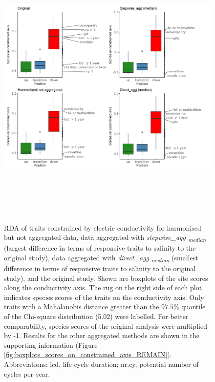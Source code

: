 \documentclass[12pt]{article}
\begin{document}
\begin{figure}[H]
  \centering
  \includegraphics[width=17cm, height=14.5cm]{boxplot_scores_combined.png}
  \caption{RDA of traits constrained by electric conductivity for harmonised but not aggregated data, data aggregated with \textit{stepwise\_agg \textsubscript{median}} (largest difference in terms of responsive traits to salinity to the original study), data aggregated with \textit{direct\_agg \textsubscript{median}} (smallest difference in terms of responsive traits to salinity to the original study), and the original study. Shown are boxplots of the site scores along the conductivity axis. The rug on the right side of each plot indicates species scores of the traits on the conductivity axis. Only traits with a Mahalanobis distance greater than the $97.5 \%$ quantile of the Chi-square distribution (5.02) were labelled. For better comparability, species scores of the original analysis were multiplied by -1. Results for the other aggregated methods are shown in the supporting information (Figure \ref{fig:boxplots_scores_on_constrained_axis_REMAIN}). Abbreviations: lcd, life cycle duration; nr.cy, potential number of cycles per year.}
  \label{fig:boxplot_scores_on_constrained_axis}
\end{figure}
\end{document}
